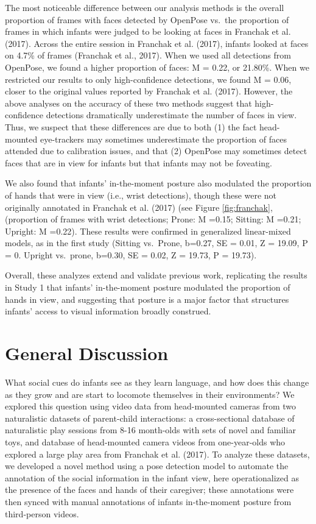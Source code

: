 \documentclass[english,man]{apa6}
\begin{document}
The most noticeable difference between our analysis methods is the
overall proportion of frames with faces detected by OpenPose vs.~the
proportion of frames in which infants were judged to be looking at faces
in Franchak et al. (2017). Across the entire session in Franchak et al.
(2017), infants looked at faces on 4.7\% of frames (Franchak et al.,
2017). When we used all detections from OpenPose, we found a higher
proportion of faces: M = 0.22, or 21.80\%. When we restricted our
results to only high-confidence detections, we found M = 0.06, closer to
the original values reported by Franchak et al. (2017). However, the
above analyses on the accuracy of these two methods suggest that
high-confidence detections dramatically underestimate the number of
faces in view. Thus, we suspect that these differences are due to both
(1) the fact head-mounted eye-trackers may sometimes underestimate the
proportion of faces attended due to calibration issues, and that (2)
OpenPose may sometimes detect faces that are in view for infants but
that infants may not be foveating.

We also found that infants' in-the-moment posture also modulated the
proportion of hands that were in view (i.e., wrist detections), though
these were not originally annotated in Franchak et al. (2017) (see
Figure \ref{fig:franchak}, (proportion of frames with wrist detections;
Prone: M =0.15; Sitting: M =0.21; Upright: M =0.22). These results were
confirmed in generalized linear-mixed models, as in the first study
(Sitting vs.~Prone, b=0.27, SE = 0.01, Z = 19.09, P = 0. Upright
vs.~prone, b=0.30, SE = 0.02, Z = 19.73, P = 19.73).

Overall, these analyzes extend and validate previous work, replicating
the results in Study 1 that infants' in-the-moment posture modulated the
proportion of hands in view, and suggesting that posture is a major
factor that structures infants' access to visual information broadly
construed.

\section{General Discussion}\label{general-discussion}

What social cues do infants see as they learn language, and how does
this change as they grow and are start to locomote themselves in their
environments? We explored this question using video data from
head-mounted cameras from two naturalistic datasets of parent-child
interactions: a cross-sectional database of naturalistic play sessions
from 8-16 month-olds with sets of novel and familiar toys, and database
of head-mounted camera videos from one-year-olds who explored a large
play area from Franchak et al. (2017). To analyze these datasets, we
developed a novel method using a pose detection model to automate the
annotation of the social information in the infant view, here
operationalized as the presence of the faces and hands of their
caregiver; these annotations were then synced with manual annotations of
infants in-the-moment posture from third-person videos.
\end{document}
